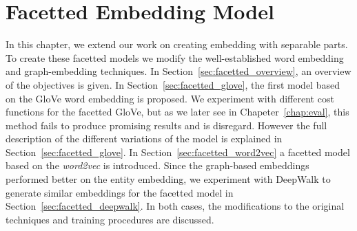
\chapter{Facetted Embedding Model}\label{chap:main}
In this chapter, we extend our work on creating embedding with separable parts. To create these facetted models we modify the well-established word embedding and graph-embedding techniques. In Section~\ref{sec:facetted_overview}, an overview of the objectives is given. In Section~\ref{sec:facetted_glove}, the first model based on the GloVe word embedding is proposed. We experiment with different cost functions for the facetted GloVe, but as we later see in Chapeter~\ref{chap:eval}, this method fails to produce promising results and is disregard. However the full description of the different variations of the model is explained in Section~\ref{sec:facetted_glove}. In Section~\ref{sec:facetted_word2vec} a facetted model based on the \emph{word2vec} is introduced. Since the graph-based embeddings performed better on the entity embedding, we experiment with DeepWalk to generate similar embeddings for the facetted model in Section~\ref{sec:facetted_deepwalk}. In both cases, the modifications to the original techniques and training procedures are discussed. 


